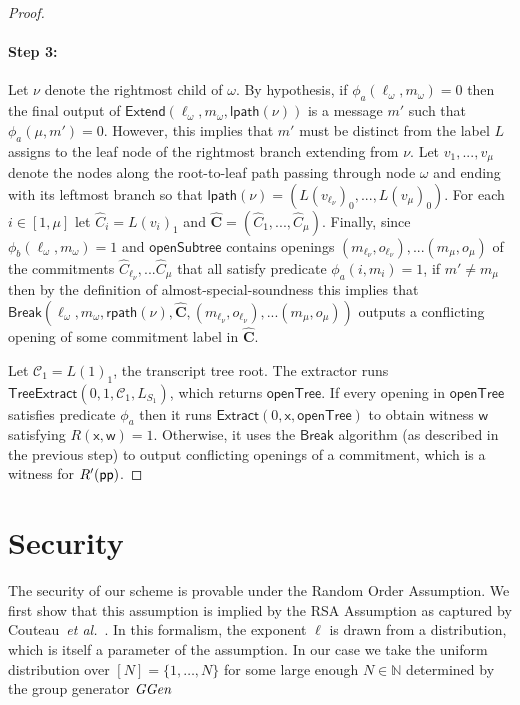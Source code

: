\documentclass{article}
\theoremstyle{definition}
\begin{document}
\begin{proof}
\paragraph{Step 3:}  Let $\nu$ denote the rightmost child of $\omega$. By hypothesis, if $\phi_a(\ell_\omega, m_\omega) = 0$ then the final output of $\textsf{Extend}(\ell_\omega, m_\omega, \textsf{lpath}(\nu))$ is a message $m'$ such that $\phi_a(\mu, m') = 0$. However, this implies that $m'$ must be distinct from the label $L$ assigns to the leaf node of the rightmost branch extending from $\nu$. Let $v_1,...,v_\mu$ denote the nodes along the root-to-leaf path passing through node $\omega$ and ending with its leftmost branch so that $\textsf{lpath}(\nu) = (L(v_{\ell_\nu})_0,...,L(v_\mu)_0)$. For each $i \in [1, \mu]$ let $\hat{C}_i = L(v_i)_1$ and $\mathbf{\hat{C}} = (\hat{C}_1,...,\hat{C}_\mu)$. Finally, since $\phi_b(\ell_\omega, m_\omega) = 1$ and $\textsf{openSubtree}$ contains openings $(m_{\ell_\nu}, o_{\ell_\nu}),...(m_\mu, o_\mu)$ of the commitments $\hat{C}_{\ell_\nu},...\hat{C}_\mu$ that all satisfy predicate $\phi_a(i, m_i) = 1$, if $m' \neq m_\mu$ then by the definition of almost-special-soundness this implies that $\textsf{Break}(\ell_\omega, m_\omega,  \textsf{rpath}(\nu), \mathbf{\hat{C}}, (m_{\ell_\nu}, o_{\ell_\nu}),...(m_{\mu}, o_{\mu}))$ outputs a conflicting opening of some commitment label in $\mathbf{\hat{C}}$. 




Let $\mathcal{C}_1 = L(1)_1$, the transcript tree root. The extractor runs $\textsf{TreeExtract}(0, 1, \mathcal{C}_1, L_{S_1})$, which returns $\textsf{openTree}$. If every opening in $\textsf{openTree}$ satisfies predicate $\phi_a$ then it runs $\textsf{Extract}(0, \mathsf{x}, \textsf{openTree})$ to obtain witness $\mathsf{w}$ satisfying $R(\mathsf{x}, \mathsf{w}) = 1$. Otherwise, it uses the $\textsf{Break}$ algorithm (as described in the previous step) to output conflicting openings of a commitment, which is a witness for $R'(\textsf{pp})$.
	
\end{proof}

\section{Security}

The security of our scheme is provable under the Random Order Assumption. We first show that this assumption is implied by the RSA Assumption as captured by Couteau~\emph{et al.}~\cite{EC:CouPetPoi17}. In this formalism, the exponent $\ell$ is drawn from a distribution, which is itself a parameter of the assumption. In our case we take the uniform distribution over $[N] = \{1, \ldots, N\}$ for some large enough $N \in \mathbb{N}$ determined by the group generator $\textit{GGen}$
\end{document}
